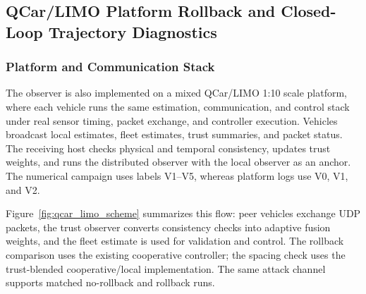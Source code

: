 \documentclass[letterpaper,journal]{IEEEtran}
\begin{document}
\subsection{QCar/LIMO Platform Rollback and Closed-Loop Trajectory Diagnostics}\label{sec:qcar_limo_platform}

\subsubsection{Platform and Communication Stack}

The observer is also implemented on a mixed QCar/LIMO 1:10 scale platform, where each vehicle runs the same estimation, communication, and control stack under real sensor timing, packet exchange, and controller execution. Vehicles broadcast local estimates, fleet estimates, trust summaries, and packet status. The receiving host checks physical and temporal consistency, updates trust weights, and runs the distributed observer with the local observer as an anchor. The numerical campaign uses labels V1--V5, whereas platform logs use V0, V1, and V2.

Figure~\ref{fig:qcar_limo_scheme} summarizes this flow: peer vehicles exchange UDP packets, the trust observer converts consistency checks into adaptive fusion weights, and the fleet estimate is used for validation and control. The rollback comparison uses the existing cooperative controller; the spacing check uses the trust-blended cooperative/local implementation. The same attack channel supports matched no-rollback and rollback runs.
\end{document}
